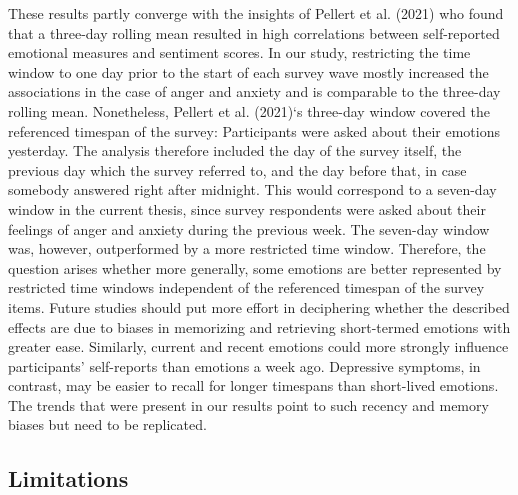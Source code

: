 \documentclass[
  english,
  jou,floatsintext]{apa7}
\begin{document}
These results partly converge with the insights of Pellert et al. (2021) who found that a three-day rolling mean resulted in high correlations between self-reported emotional measures and sentiment scores. In our study, restricting the time window to one day prior to the start of each survey wave mostly increased the associations in the case of anger and anxiety and is comparable to the three-day rolling mean. Nonetheless, Pellert et al. (2021)`s three-day window covered the referenced timespan of the survey: Participants were asked about their emotions yesterday. The analysis therefore included the day of the survey itself, the previous day which the survey referred to, and the day before that, in case somebody answered right after midnight. This would correspond to a seven-day window in the current thesis, since survey respondents were asked about their feelings of anger and anxiety during the previous week. The seven-day window was, however, outperformed by a more restricted time window. Therefore, the question arises whether more generally, some emotions are better represented by restricted time windows independent of the referenced timespan of the survey items. Future studies should put more effort in deciphering whether the described effects are due to biases in memorizing and retrieving short-termed emotions with greater ease. Similarly, current and recent emotions could more strongly influence participants' self-reports than emotions a week ago. Depressive symptoms, in contrast, may be easier to recall for longer timespans than short-lived emotions. The trends that were present in our results point to such recency and memory biases but need to be replicated.

\hypertarget{limitations}{%
\subsection{Limitations}\label{limitations}}
\end{document}
